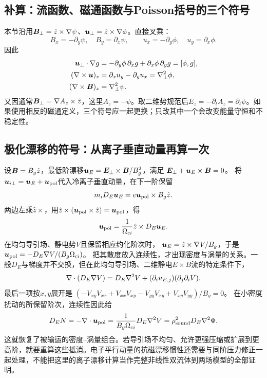\subsection{补算：流函数、磁通函数与Poisson括号的三个符号}
本节沿用$\bm{B}_\perp=\hat z\times\nabla\psi$、$\bm{u}_\perp=\hat z\times\nabla\phi$。直接叉乘：
\begin{equation}
 B_x=-\partial_y\psi,\quad B_y=\partial_x\psi,\qquad
 u_x=-\partial_y\phi,\quad u_y=\partial_x\phi.
\end{equation}
因此
\begin{align}
 \bm{u}_\perp\cdot\nabla g
 &=-\partial_y\phi\,\partial_xg+\partial_x\phi\,\partial_yg
 =[\phi,g],\\
 (\nabla\times\bm{u})_z
 &=\partial_xu_y-\partial_yu_x=\nabla_\perp^2\phi,\\
 (\nabla\times\bm{B})_z&=\nabla_\perp^2\psi.
\end{align}
又因通常$\bm{B}_\perp=\nabla A_z\times\hat z$，这里$A_z=-\psi$。取二维势规范后$E_z=-\partial_tA_z=\partial_t\psi$。如果使用相反的磁通定义，三个符号应一起更换；只改其中一个会改变能量守恒和不稳定性。

\subsection{极化漂移的符号：从离子垂直动量再算一次}
设$\bm{B}=B_g\hat z$，最低阶漂移$\bm{u}_E=\bm{E}_\perp\times\bm{B}/B_g^2$，满足
$\bm{E}_\perp+\bm{u}_E\times\bm{B}=0$。
将$\bm{u}_{i\perp}=\bm{u}_E+\bm{u}_{\rm pol}$代入冷离子垂直动量，在下一阶保留
\begin{equation}
 m_iD_E\bm{u}_E=e\bm{u}_{\rm pol}\times B_g\hat z.
\end{equation}
两边左乘$\hat z\times$，用$\hat z\times(\bm{u}_{\rm pol}\times\hat z)=\bm{u}_{\rm pol}$，得
\begin{equation}
 \bm{u}_{\rm pol}={1\over\Omega_{ci}}\hat z\times D_E\bm{u}_E.
\end{equation}
在均匀导引场、静电势$V$且保留相应约化阶次时，
$\bm{u}_E=\hat z\times\nabla V/B_g$，于是
$\bm{u}_{\rm pol}=-D_E\nabla V/(B_g\Omega_{ci})$。
把其散度放入连续性，才出现密度与涡量的关系。一般$D_E$与梯度并不交换，但在此均匀导引场、二维静电$E\times B$流的特定条件下，
\begin{equation}
 \nabla\cdot(D_E\nabla V)
 =D_E\nabla^2V+(\partial_i u_{E,j})(\partial_j\partial_iV).
\end{equation}
最后一项按$x,y$展开是
$(-V_{xy}V_{xx}+V_{xx}V_{xy}-V_{yy}V_{xy}+V_{xy}V_{yy})/B_g=0$。
在小密度扰动的所保留阶次，连续性因此给
\begin{equation}
 D_EN=-\nabla\cdot\bm{u}_{\rm pol}
 ={1\over B_g\Omega_{ci}}D_E\nabla^2V
 =\rho_{\rm sound}^2D_E\nabla^2\Phi.
\end{equation}
这就恢复了被输运的密度--涡量组合。若导引场不均匀、允许更强压缩或扩展到更高阶，就要重算这些抵消。电子平行动量的抗磁漂移惯性还需要与同阶压力修正一起处理，不能把这里的离子漂移计算当作完整非线性双流体到两场模型的全部证明。\citep{Schep1994,L049}

